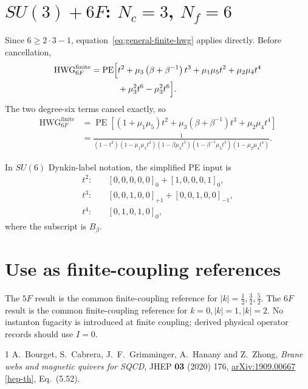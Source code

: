 \documentclass[9pt]{article}
\newcommand{\PE}{\operatorname{PE}}
\newcommand{\HWG}{\operatorname{HWG}}
\begin{document}
\section*{$SU(3)+6F$: $N_c=3$, $N_f=6$}
Since $6\geq2\cdot3-1$, equation~\eqref{eq:general-finite-hwg} applies directly.
Before cancellation,
\begin{align}
\HWG^{\mathrm{finite}}_{6F}
=\PE\!\Big[
&t^2
+\mu_3\left(\beta+\beta^{-1}\right)t^3
+\mu_1\mu_5t^2
+\mu_2\mu_4t^4 \notag\\
&+\mu_3^2t^6
-\mu_3^2t^6
\Big].
\end{align}
The two degree-six terms cancel exactly, so
\begin{align}
\HWG^{\mathrm{finite}}_{6F}
&=\PE\!\left[
(1+\mu_1\mu_5)t^2
+\mu_3\left(\beta+\beta^{-1}\right)t^3
+\mu_2\mu_4t^4
\right] \\
&=\frac{1}
{(1-t^2)(1-\mu_1\mu_5t^2)
 (1-\beta\mu_3t^3)(1-\beta^{-1}\mu_3t^3)
 (1-\mu_2\mu_4t^4)}.
\end{align}

In $SU(6)$ Dynkin-label notation, the simplified PE input is
\begin{align}
 t^2:&\quad [0,0,0,0,0]_{0}+[1,0,0,0,1]_{0},\\
 t^3:&\quad [0,0,1,0,0]_{+1}+[0,0,1,0,0]_{-1},\\
 t^4:&\quad [0,1,0,1,0]_{0},
\end{align}
where the subscript is $B_\beta$.

\section*{Use as finite-coupling references}
The $5F$ result is the common finite-coupling reference for
$|k|=\frac12,\frac32,\frac52$.  The $6F$ result is the common finite-coupling
reference for $k=0,|k|=1,|k|=2$.  No instanton fugacity is introduced at
finite coupling; derived physical operator records should use $I=0$.

\vfill
\begin{thebibliography}{1}\footnotesize
{}
A.~Bourget, S.~Cabrera, J.~F.~Grimminger, A.~Hanany and Z.~Zhong,
\emph{Brane webs and magnetic quivers for SQCD},
JHEP \textbf{03} (2020) 176,
\href{https://arxiv.org/abs/1909.00667}{arXiv:1909.00667 [hep-th]},
Eq.~(5.52).
\end{thebibliography}
\end{document}
